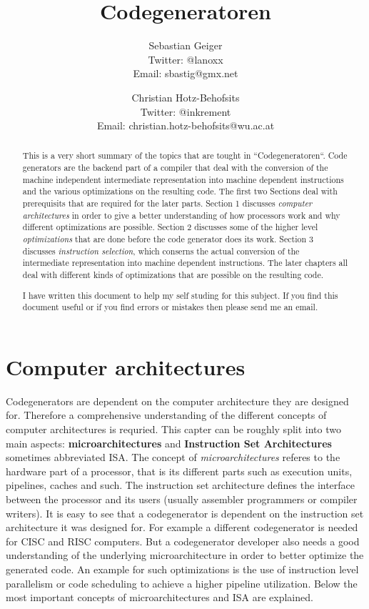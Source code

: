 \documentclass[a4paper,10pt]{article}
\title{Codegeneratoren}
\author{
Sebastian Geiger\\ \small{Twitter: @lanoxx} \\ \small{Email: sbastig@gmx.net}
\and
Christian Hotz-Behofsits\\ \small{Twitter: @inkrement} \\ \small{Email: christian.hotz-behofsits@wu.ac.at}
}
\begin{document}
\maketitle

\begin{abstract}
This is a very short summary of the topics that are tought in ``Codegeneratoren``. Code generators are the backend part of a compiler
that deal with the conversion of the machine independent intermediate representation into machine dependent instructions and the various
optimizations on the resulting code. The first two Sections deal with prerequisits that are required for the later parts. Section 1
discusses \textit{computer architectures} in order to give a better understanding of how processors work and why different optimizations
are possible. Section 2 discusses some of the higher level \textit{optimizations} that are done before the code generator does its work.
Section 3 discusses \textit{instruction selection}, which conserns the actual conversion of the intermediate representation into machine
dependent instructions. The later chapters all deal with different kinds of optimizations that are possible on the resulting code.

I have written this document to help my self studing for this subject. If you find this document useful or if you find errors or mistakes
then please send me an email.
\end{abstract}

\tableofcontents

\section{Computer architectures}
Codegenerators are dependent on the computer architecture they are designed for. Therefore a comprehensive understanding of the different
concepts of computer architectures is requried. This capter can be roughly split into two main aspects: \textbf{microarchitectures} and
\textbf{Instruction Set Architectures} sometimes abbreviated ISA. The concept of \textit{microarchitectures} referes to the hardware part
of a processor, that is its different parts such as execution units, pipelines, caches and such. The instruction set architecture defines
the interface between the processor and its users (usually assembler programmers or compiler writers). It is easy to see that a
codegenerator is dependent on the instruction set architecture it was designed for. For example a different codegenerator is needed for
CISC and RISC computers. But a codegenerator developer also needs a good understanding of the underlying microarchitecture in order to
better optimize the generated code. An example for such optimizations is the use of instruction level parallelism or code scheduling to
achieve a higher pipeline utilization. Below the most important concepts of microarchitectures and ISA are explained.
\end{document}
